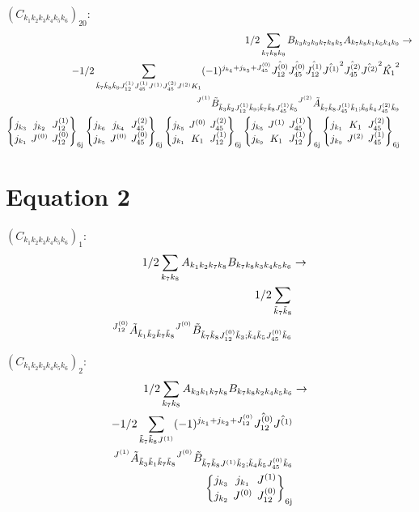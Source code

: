 \documentclass[11pt]{article}
\newcommand{\sixj}[6]{\begingroup\setlength{\arraycolsep}{0.2em}\begin{Bmatrix} #1 & #2 & #3 \\ #4 & #5 & #6 \end{Bmatrix}_{\text{6j}}\endgroup}
\begin{document}
$\left({C}_{{k}_{1}{k}_{2}{k}_{3}{k}_{4}{k}_{5}{k}_{6}}\right)_{20}$:
\begin{align}
1/2\sum_{{k}_{7}{k}_{8}{k}_{9}}{B}_{{k}_{3}{k}_{2}{k}_{9}{k}_{7}{k}_{8}{k}_{5}}{A}_{{k}_{7}{k}_{8}{k}_{1}{k}_{6}{k}_{4}{k}_{9}}&\rightarrow \notag \\-1/2\sum_{\tilde{k}_{7}\tilde{k}_{8}\tilde{k}_{9}J^{(1)}_{12}J^{(1)}_{45}J^{(1)}J^{(2)}_{45}J^{(2)}K_{1}}(-1)^{j_{{k}_{4}} +j_{{k}_{5}} +J^{(0)}_{45} }\hat{J^{(0)}_{12}}\hat{J^{(0)}_{45}}\hat{J^{(1)}_{12}}\hat{J^{(1)}}^{2}\hat{J^{(2)}_{45}}\hat{J^{(2)}}^{2}\hat{K_{1}}^{2}& \notag \\{}^{J^{(1)}}\tilde{B}_{\tilde{k}_{3}\tilde{k}_{2}J^{(1)}_{12}\tilde{k}_{9};\tilde{k}_{7}\tilde{k}_{8}J^{(1)}_{45}\tilde{k}_{5}}{}^{J^{(2)}}\tilde{A}_{\tilde{k}_{7}\tilde{k}_{8}J^{(1)}_{45}\tilde{k}_{1};\tilde{k}_{6}\tilde{k}_{4}J^{(2)}_{45}\tilde{k}_{9}}& \notag \\\sixj{j_{{k}_{3}}}{j_{{k}_{2}}}{J^{(1)}_{12}}{j_{{k}_{1}}}{J^{(0)}}{J^{(0)}_{12}}\sixj{j_{{k}_{6}}}{j_{{k}_{4}}}{J^{(2)}_{45}}{j_{{k}_{5}}}{J^{(0)}}{J^{(0)}_{45}}\sixj{j_{{k}_{5}}}{J^{(0)}}{J^{(2)}_{45}}{j_{{k}_{1}}}{K_{1}}{J^{(1)}_{12}}\sixj{j_{{k}_{5}}}{J^{(1)}}{J^{(1)}_{45}}{j_{{k}_{9}}}{K_{1}}{J^{(1)}_{12}}\sixj{j_{{k}_{1}}}{K_{1}}{J^{(2)}_{45}}{j_{{k}_{9}}}{J^{(2)}}{J^{(1)}_{45}}
\end{align}

\section{Equation 2}
$\left({C}_{{k}_{1}{k}_{2}{k}_{3}{k}_{4}{k}_{5}{k}_{6}}\right)_{1}$:
\begin{align}
1/2\sum_{{k}_{7}{k}_{8}}{A}_{{k}_{1}{k}_{2}{k}_{7}{k}_{8}}{B}_{{k}_{7}{k}_{8}{k}_{3}{k}_{4}{k}_{5}{k}_{6}}&\rightarrow \notag \\1/2\sum_{\tilde{k}_{7}\tilde{k}_{8}}& \notag \\{}^{J^{(0)}_{12}}\tilde{A}_{\tilde{k}_{1}\tilde{k}_{2}\tilde{k}_{7}\tilde{k}_{8}}{}^{J^{(0)}}\tilde{B}_{\tilde{k}_{7}\tilde{k}_{8}J^{(0)}_{12}\tilde{k}_{3};\tilde{k}_{4}\tilde{k}_{5}J^{(0)}_{45}\tilde{k}_{6}}& \notag \\
\end{align}

$\left({C}_{{k}_{1}{k}_{2}{k}_{3}{k}_{4}{k}_{5}{k}_{6}}\right)_{2}$:
\begin{align}
1/2\sum_{{k}_{7}{k}_{8}}{A}_{{k}_{3}{k}_{1}{k}_{7}{k}_{8}}{B}_{{k}_{7}{k}_{8}{k}_{2}{k}_{4}{k}_{5}{k}_{6}}&\rightarrow \notag \\-1/2\sum_{\tilde{k}_{7}\tilde{k}_{8}J^{(1)}}(-1)^{j_{{k}_{1}} +j_{{k}_{2}} +J^{(0)}_{12} }\hat{J^{(0)}_{12}}\hat{J^{(1)}}& \notag \\{}^{J^{(1)}}\tilde{A}_{\tilde{k}_{3}\tilde{k}_{1}\tilde{k}_{7}\tilde{k}_{8}}{}^{J^{(0)}}\tilde{B}_{\tilde{k}_{7}\tilde{k}_{8}J^{(1)}\tilde{k}_{2};\tilde{k}_{4}\tilde{k}_{5}J^{(0)}_{45}\tilde{k}_{6}}& \notag \\\sixj{j_{{k}_{3}}}{j_{{k}_{1}}}{J^{(1)}}{j_{{k}_{2}}}{J^{(0)}}{J^{(0)}_{12}}
\end{align}
\end{document}
